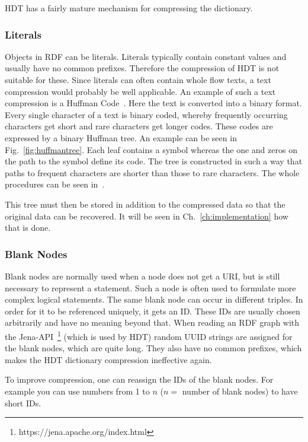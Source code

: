 HDT has a fairly mature mechanism for compressing the dictionary.

\subsubsection{Literals}\label{sec:approachLiterals}

Objects in RDF can be literals. Literals typically contain constant values and usually have no common prefixes. Therefore the compression of HDT is not suitable for these. Since literals can often contain whole flow texts, a text compression would probably be well applicable. An example of such a text compression is a Huffman Code~\cite{huffman}. Here the text is converted into a binary format. Every single character of a text is binary coded, whereby frequently occurring characters get short and rare characters get longer codes. These codes are expressed by a binary Huffman tree. An example can be seen in Fig.~\ref{fig:huffmantree}. Each leaf contains a symbol whereas the one and zeros on the path to the symbol define its code. The tree is constructed in such a way that paths to frequent characters are shorter than those to rare characters. The whole procedures can be seen in~\cite{huffman}.

This tree must then be stored in addition to the compressed data so that the original data can be recovered. It will be seen in Ch.~\ref{ch:implementation} how that is done.

\subsubsection{Blank Nodes}\label{sec:approachBlankNodes}

Blank nodes are normally used when a node does not get a URI, but is still necessary to represent a statement. Such a node is often used to formulate more complex logical statements. The same blank node can occur in different triples. In order for it to be referenced uniquely, it gets an ID. These IDs are usually chosen arbitrarily and have no meaning beyond that. When reading an RDF graph with the Jena-API~\footnote{\label{foot:5}https://jena.apache.org/index.html} (which is used by HDT) random UUID strings are assigned for the blank nodes, which are quite long. They also have no common prefixes, which makes the HDT dictionary compression ineffective again. 

To improve compression, one can reassign the IDs of the blank nodes. For example you can use numbers from 1 to $n$ ($n=$ number of blank nodes) to have short IDs. 

